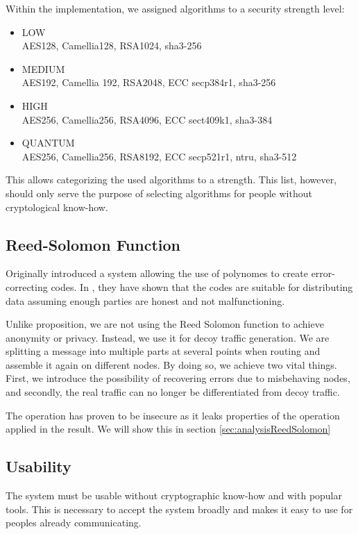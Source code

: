 Within the implementation, we assigned algorithms to a security strength level:
\begin{itemize}
	\item LOW\\
	AES128, Camellia128, RSA1024, sha3-256
	\item MEDIUM\\
	AES192, Camellia 192, RSA2048, ECC secp384r1, sha3-256
	\item HIGH\\
	AES256, Camellia256, RSA4096, ECC sect409k1, sha3-384
	\item QUANTUM\\
	AES256, Camellia256, RSA8192, ECC secp521r1, ntru, sha3-512
\end{itemize}

This allows categorizing the used algorithms to a strength. This list, however, should only serve the purpose of selecting algorithms for people without cryptological know-how.

\subsection{Reed-Solomon Function}
Originally \cite{reed1960polynomial} introduced a system allowing the use of polynomes to create error-correcting codes. In \cite{chaum1988multiparty} \citeauthor{chaum1988multiparty}, they have shown that the codes are suitable for distributing data assuming enough parties are honest and not malfunctioning.

Unlike \citeauthor{chaum1988multiparty} proposition, we are not using the Reed Solomon function to achieve anonymity or privacy. Instead, we use it for decoy traffic generation. We are splitting a message into multiple parts at several points when routing and assemble it again on different nodes. By doing so, we achieve two vital things. First, we introduce the possibility of recovering errors due to misbehaving nodes, and secondly, the real traffic can no longer be differentiated from decoy traffic. 

The operation has proven to be insecure as it leaks properties of the operation applied in the result. We will show this in section \ref{sec:analysisReedSolomon}

\subsection{Usability}
The system must be usable without cryptographic know-how and with popular tools. This is necessary to accept the system broadly and makes it easy to use for peoples already communicating.

